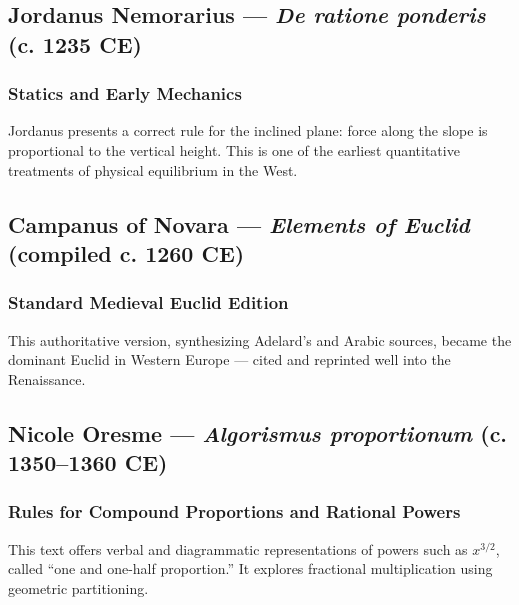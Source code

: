 \documentclass[9pt]{article}
\begin{document}
\vspace{0.5em}

\subsection*{Jordanus Nemorarius — \textit{De ratione ponderis} (c. 1235 CE)}

\subsubsection*{Statics and Early Mechanics}

Jordanus presents a correct rule for the inclined plane: force along the slope is proportional to the vertical height.  
This is one of the earliest quantitative treatments of physical equilibrium in the West.

\vspace{0.5em}

\subsection*{Campanus of Novara — \textit{Elements of Euclid} (compiled c. 1260 CE)}

\subsubsection*{Standard Medieval Euclid Edition}

This authoritative version, synthesizing Adelard’s and Arabic sources, became the dominant Euclid in Western Europe — cited and reprinted well into the Renaissance.

\vspace{0.5em}

\subsection*{Nicole Oresme — \textit{Algorismus proportionum} (c. 1350–1360 CE)}

\subsubsection*{Rules for Compound Proportions and Rational Powers}

This text offers verbal and diagrammatic representations of powers such as \( x^{3/2} \), called “one and one-half proportion.”  
It explores fractional multiplication using geometric partitioning.

\vspace{0.5em}
\end{document}
